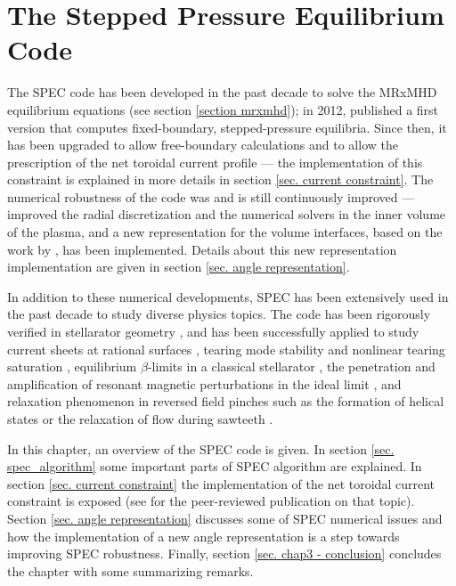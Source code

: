 \documentclass[my_thesis.tex]{subfiles}
\begin{document}
\chapter{The Stepped Pressure Equilibrium Code}\label{ch3.SPEC}

The SPEC code has been developed in the past decade to solve the MRxMHD equilibrium equations (see section \ref{section mrxmhd}); in 2012, \citet{Hudson2012} published a first version that computes fixed-boundary, stepped-pressure equilibria. Since then, it has been upgraded to allow free-boundary calculations \citep{Hudson2020c} and to allow the prescription of the net toroidal current profile \citep{Baillod2021} --- the implementation of this constraint is explained in more details in section \ref{sec. current constraint}. The numerical robustness of the code was and is still continuously improved --- \citet{Qu2020} improved the radial discretization and the numerical solvers in the inner volume of the plasma, and a new representation for the volume interfaces, based on the work by \citet{Henneberg2021}, has been implemented. Details about this new representation implementation are given in section \ref{sec. angle representation}.

In addition to these numerical developments, SPEC has been extensively used in the past decade to study diverse physics topics. The code has been rigorously verified in stellarator geometry \citep{Loizu2016}, and has been successfully applied to study current sheets at rational surfaces \citep{Loizu2015,Loizu2015a,Huang2021}, tearing mode stability \citep{Loizu2019} and nonlinear tearing saturation \citep{Loizu2020}, equilibrium $\beta$-limits in a classical stellarator \citep{Loizu2017}, the penetration and amplification of resonant magnetic perturbations in the ideal limit \citep{Loizu2016}, and relaxation phenomenon in reversed field pinches such as the formation of helical states \citep{Dennis2013a} or the relaxation of flow during sawteeth \citep{Dennis2014,Qu2020}. 


In this chapter, an overview of the SPEC code is given. In section \ref{sec. spec_algorithm} some important parts of SPEC algorithm are explained. In section \ref{sec. current constraint} the implementation of the net toroidal current constraint is exposed (see \citep{Baillod2021} for the peer-reviewed publication on that topic). Section \ref{sec. angle representation} discusses some of SPEC numerical issues and how the implementation of a new angle representation is a step towards improving SPEC robustness. Finally, section \ref{sec. chap3 - conclusion} concludes the chapter with some summarizing remarks.
\end{document}
